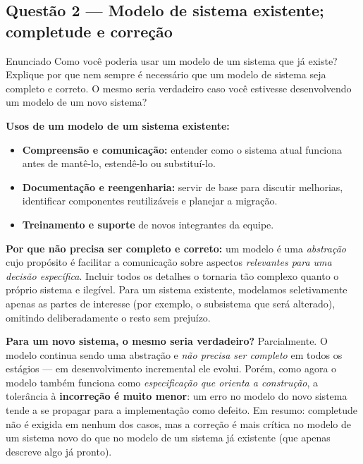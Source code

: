 \documentclass[11pt,a4paper]{article}
\begin{document}
\subsection*{Questão 2 — Modelo de sistema existente; completude e correção}
\begin{questao}{Enunciado}
Como você poderia usar um modelo de um sistema que já existe? Explique por que
nem sempre é necessário que um modelo de sistema seja completo e correto. O
mesmo seria verdadeiro caso você estivesse desenvolvendo um modelo de um novo
sistema?
\end{questao}
\begin{resposta}
\textbf{Usos de um modelo de um sistema existente:}
\begin{itemize}[nosep]
  \item \textbf{Compreensão e comunicação:} entender como o sistema atual
        funciona antes de mantê-lo, estendê-lo ou substituí-lo.
  \item \textbf{Documentação e reengenharia:} servir de base para discutir
        melhorias, identificar componentes reutilizáveis e planejar a migração.
  \item \textbf{Treinamento e suporte} de novos integrantes da equipe.
\end{itemize}

\textbf{Por que não precisa ser completo e correto:} um modelo é uma
\emph{abstração} cujo propósito é facilitar a comunicação sobre aspectos
\emph{relevantes para uma decisão específica}. Incluir todos os detalhes o
tornaria tão complexo quanto o próprio sistema e ilegível. Para um sistema
existente, modelamos seletivamente apenas as partes de interesse (por exemplo, o
subsistema que será alterado), omitindo deliberadamente o resto sem prejuízo.

\textbf{Para um novo sistema, o mesmo seria verdadeiro?} Parcialmente. O modelo
continua sendo uma abstração e \emph{não precisa ser completo} em todos os
estágios — em desenvolvimento incremental ele evolui. Porém, como agora o modelo
também funciona como \emph{especificação que orienta a construção}, a tolerância
à \textbf{incorreção é muito menor}: um erro no modelo do novo sistema tende a se
propagar para a implementação como defeito. Em resumo: completude não é exigida
em nenhum dos casos, mas a correção é mais crítica no modelo de um sistema novo
do que no modelo de um sistema já existente (que apenas descreve algo já pronto).
\end{resposta}
\end{document}
